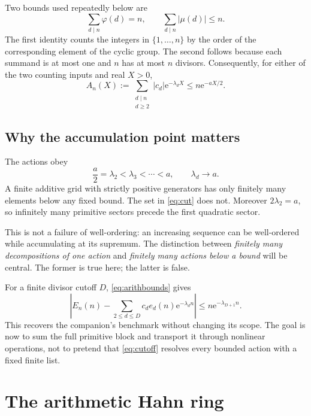 \documentclass[11pt,a4paper]{article}
\numberwithin{equation}{section}
\theoremstyle{definition}
\theoremstyle{remark}
\newcommand{\ee}{\mathrm e}
\newcommand{\abs}[1]{\left|#1\right|}
\begin{document}
Two bounds used repeatedly below are
\begin{equation}
 \sum_{d\mid n}\varphi(d)=n,
 \qquad \sum_{d\mid n}|\mu(d)|\le n.
 \label{eq:arithbounds}
\end{equation}
The first identity counts the integers in $\{1,\ldots,n\}$ by the order
of the corresponding element of the cyclic group. The second follows
because each summand is at most one and $n$ has at most $n$ divisors.
Consequently, for either of the two counting inputs and real $X>0$,
\begin{equation}
 A_n(X):=\sum_{\substack{d\mid n\\d\ge2}}|c_d|\ee^{-\lambda_dX}
 \le n\ee^{-aX/2}.
 \label{eq:An}
\end{equation}

\subsection{Why the accumulation point matters}

The actions obey
\begin{equation}
 \frac a2=\lambda_2<\lambda_3<\cdots<a,
 \qquad \lambda_d\longrightarrow a.
 \label{eq:cut}
\end{equation}
A finite additive grid with strictly positive generators has only
finitely many elements below any fixed bound. The set in
\eqref{eq:cut} does not. Moreover $2\lambda_2=a$, so infinitely many
primitive sectors precede the first quadratic sector.

This is not a failure of well-ordering: an increasing sequence can be
well-ordered while accumulating at its supremum. The distinction between
\emph{finitely many decompositions of one action} and \emph{finitely many
actions below a bound} will be central. The former is true here; the
latter is false.

For a finite divisor cutoff $D$, \eqref{eq:arithbounds} gives
\begin{equation}
 \abs{E_n(n)-\sum_{2\le d\le D}c_d e_d(n)\ee^{-\lambda_dn}}
 \le n\ee^{-\lambda_{D+1}n}.
 \label{eq:cutoff}
\end{equation}
This recovers the companion's benchmark without changing its scope.
The goal is now to sum the full primitive block and transport it through
nonlinear operations, not to pretend that \eqref{eq:cutoff} resolves every
bounded action with a fixed finite list.

\section{The arithmetic Hahn ring}\label{sec:formal}
\end{document}
